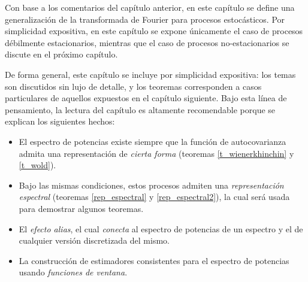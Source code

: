 \documentclass[12pt,letterpaper]{book}
\begin{document}
Con base a los comentarios del capítulo anterior, en este capítulo se define una generalización de la transformada de Fourier
para procesos estocásticos.
%
Por simplicidad expositiva, en este capítulo se expone únicamente el caso de procesos débilmente estacionarios, mientras que el caso de procesos no-estacionarios se discute en el próximo capítulo.

De forma general, este capítulo se incluye por simplicidad expositiva: los temas son discutidos sin lujo de detalle, y los teoremas corresponden a casos particulares de aquellos expuestos en el capítulo siguiente.
%
Bajo esta línea de pensamiento, la lectura del capítulo es altamente recomendable porque se explican los siguientes hechos:
\begin{itemize}
\item El espectro de potencias existe siempre que la función de autocovarianza admita una representación de \textit{cierta forma} (teoremas \ref{t_wienerkhinchin} y \ref{t_wold}).
\item Bajo las mismas condiciones, estos procesos admiten una \textit{representación espectral} (teoremas \ref{rep_espectral} y \ref{rep_espectral2}), la cual será usada para demostrar algunos teoremas.
\item El \textit{efecto alias}, el cual \textit{conecta} al espectro de potencias de un espectro y el de cualquier versión discretizada del mismo.
\item La construcción de estimadores consistentes para el espectro de potencias usando \textit{funciones de ventana}.
\end{itemize}
%
%


%
\end{document}
